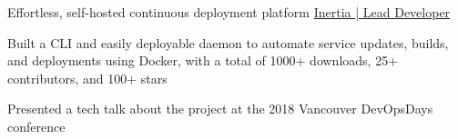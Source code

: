 \begin{cventries}

  \cventry
    {Effortless, self-hosted continuous deployment platform} %
    {\href{https://github.com/ubclaunchpad/inertia}{Inertia | Lead Developer}} %
    {} %
    {} %
    {
      \begin{cvitems} %
        \item {Built a CLI and easily deployable daemon to automate service updates, builds, and deployments using Docker, with a total of 1000+ downloads, 25+ contributors, and 100+ stars}
        \item {Presented a tech talk about the project at the 2018 Vancouver DevOpsDays conference}
      \end{cvitems}
    }
\iffalse
  \cventry
    {Continuous benchmarking and benchmark visualization} %
    {gobenchdata | Personal Project} %
    {\linktext{bobheadxi.dev/r/gobenchdata}} %
    {} %
    {
      \begin{cvitems} %
        \item {Created a GitHub Action, CLI, and web app to chart performance improvements, used 100+ times every day}
      \end{cvitems}
    }
\fi


\end{cventries}
